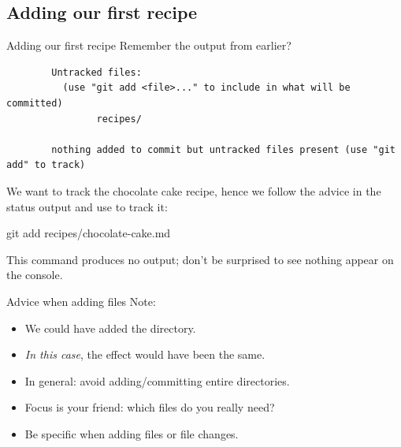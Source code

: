 \subsection{Adding our first recipe}

\begin{frame}[fragile]{Adding our first recipe}
    Remember the  output from earlier?
    \begin{verbatim}
        Untracked files:
          (use "git add <file>..." to include in what will be committed)
                recipes/

        nothing added to commit but untracked files present (use "git add" to track)
    \end{verbatim}

    We want to track the chocolate cake recipe, hence we follow the advice
    in the status output and use  to track it:
    \begin{shellcode}
        git add recipes/chocolate-cake.md
    \end{shellcode}
    This command produces no output; don't be surprised to see nothing
    appear on the console.
\end{frame}

\begin{frame}[fragile]{Advice when adding files}
    Note:
    \begin{itemize}
        \item We could have added the  directory.
        \item \emph{In this case}, the effect would have been the same.
        \item In general: avoid adding/committing entire directories.
        \item Focus is your friend: which files do you really need?
        \item Be specific when adding files or file changes.
    \end{itemize}
\end{frame}

